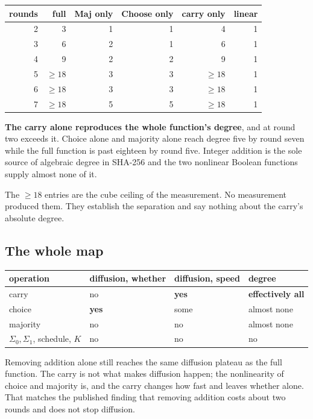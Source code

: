 \begin{center}
\begin{tabular}{rrrrrr}
\toprule
rounds & full & Maj only & Choose only & carry only & linear \\
\midrule
2 & 3 & 1 & 1 & 4 & 1 \\
3 & 6 & 2 & 1 & 6 & 1 \\
4 & 9 & 2 & 2 & 9 & 1 \\
5 & \(\geq 18\) & 3 & 3 & \(\geq 18\) & 1 \\
6 & \(\geq 18\) & 3 & 3 & \(\geq 18\) & 1 \\
7 & \(\geq 18\) & 5 & 5 & \(\geq 18\) & 1 \\
\bottomrule
\end{tabular}
\end{center}

\textbf{The carry alone reproduces the whole function's degree}, and at round two exceeds it. Choice alone and majority alone reach degree five by round seven while the full function is past eighteen by round five. Integer addition is the sole source of algebraic degree in SHA-256 and the two nonlinear Boolean functions supply almost none of it.

The \(\geq 18\) entries are the cube ceiling of the measurement. No measurement produced them. They establish the separation and say nothing about the carry's absolute degree.

\subsection{The whole map}

\begin{center}
\begin{tabular}{llll}
\toprule
operation & diffusion, whether & diffusion, speed & degree \\
\midrule
carry & no & \textbf{yes} & \textbf{effectively all} \\
choice & \textbf{yes} & some & almost none \\
majority & no & no & almost none \\
\(\Sigma_0, \Sigma_1\), schedule, \(K\) & no & no & no \\
\bottomrule
\end{tabular}
\end{center}

Removing addition alone still reaches the same diffusion plateau as the full function. The carry is not what makes diffusion happen; the nonlinearity of choice and majority is, and the carry changes how fast and leaves whether alone. That matches the published finding that removing addition costs about two rounds and does not stop diffusion.

